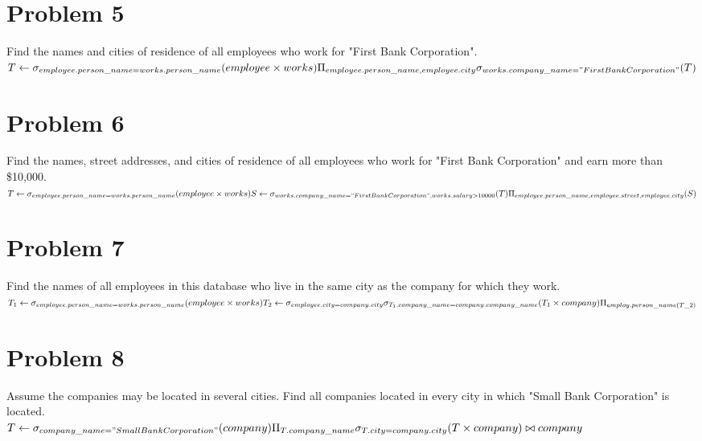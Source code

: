 \documentclass[paper=a4, fontsize=11pt]{scrartcl} %
\numberwithin{equation}{section} %
\numberwithin{figure}{section} %
\numberwithin{table}{section} %
\begin{document}
\section*{Problem 5}
Find the names and cities of residence of all employees who work for "First Bank Corporation".\\
$T\leftarrow\sigma_{employee.person\_name = works.person\_name}(employee\times works)\\
\Pi_{employee.person\_name,employee.city}\sigma_{works.company\_name="First Bank Corporation"}(T)$

\section{Problem 6}
Find the names, street addresses, and cities of residence of all employees who work for "First Bank Corporation" and earn more than \$10,000.\\
$
T \leftarrow \sigma_{employee.person\_name = works.person\_name}(employee\times works) \\
S \leftarrow \sigma_{works.company\_name="First Bank Corporation",works.salary>10000}(T)\\
\Pi_{employee.person\_name,employee.street,employee.city}(S)$


\section{Problem 7}
Find the names of all employees in this database who live in the same city as the company for which they work.\\
$T_1\leftarrow \sigma_{employee.person\_name = works.person\_name}(employee\times works)\\
T_2\leftarrow\sigma_{employee.city = company.city}\sigma_{T_1.company\_name = company.company\_name}(T_1 \times company)\\
\Pi_{employ.person\_name(T\_2)}$
\section{Problem 8}
Assume the companies may be located in several cities. Find all companies
located in every city in which "Small Bank Corporation" is located.\\
$T\leftarrow\sigma_{company\_name = "Small Bank Corporation"}(company) \\
\Pi_{T.company\_name}\sigma_{T.city = company.city}(T\times company)\bowtie company$
\end{document}
